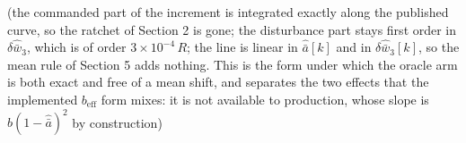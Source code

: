 \documentclass[11pt,a4paper,fontset=none]{ctexart}
\newcommand{\ba}{\bar{a}}
\newcommand{\bw}{\bar{w}}
\begin{document}
(the commanded part of the increment is integrated exactly along the published
curve, so the ratchet of Section 2 is gone; the disturbance part stays first
order in $\delta\hat{\bw}_3$, which is of order $3\times10^{-4}\,R$; the
line is linear in $\hat{\ba}[k]$ and in $\delta\hat{\bw}_3[k]$, so the mean
rule of Section 5 adds nothing. This is the form under which the oracle arm is
both exact and free of a mean shift, and separates the two effects that the
implemented $b_{\mathrm{eff}}$ form mixes: it is not available to production,
whose slope is $b(1-\hat{\ba})^{2}$ by construction)
\end{document}
